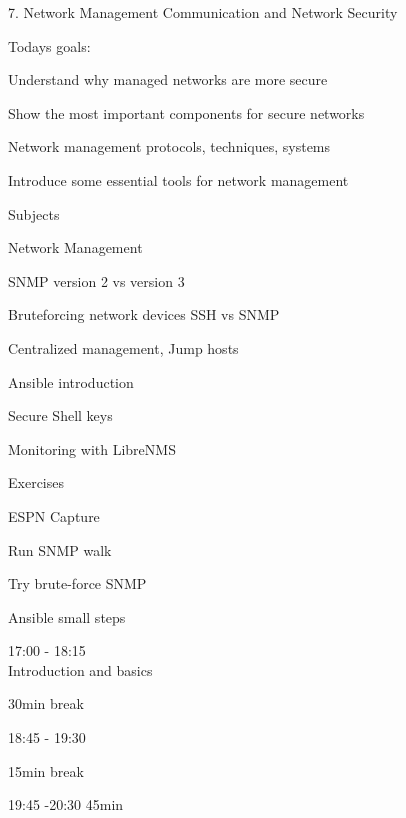 \documentclass[Screen16to9,17pt]{foils}
\begin{document}
\mytitlepage
{7. Network Management}
{Communication and Network Security \the\year}



Todays goals:
\begin{list2}
\item Understand why managed networks are more secure
\item Show the most important components for secure networks
\item Network management protocols, techniques, systems
\item Introduce some essential tools for network management
\end{list2}






\begin{list1}
\item Subjects
\begin{list2}
\item Network Management
\item SNMP version 2 vs version 3
\item Bruteforcing network devices SSH vs SNMP
\item Centralized management, Jump hosts
\item Ansible introduction
\item Secure Shell keys
\item Monitoring with LibreNMS
\end{list2}
\item Exercises
\begin{list2}
\item ESPN Capture
\item Run SNMP walk
\item Try brute-force SNMP
\item Ansible small steps
\end{list2}
\end{list1}


\begin{list2}
\item 17:00 - 18:15\\
Introduction and basics
\item 30min break\\

\item 18:45 - 19:30\\

\item 15min break\\

\item 19:45 -20:30 45min\\
\end{list2}
\end{document}
